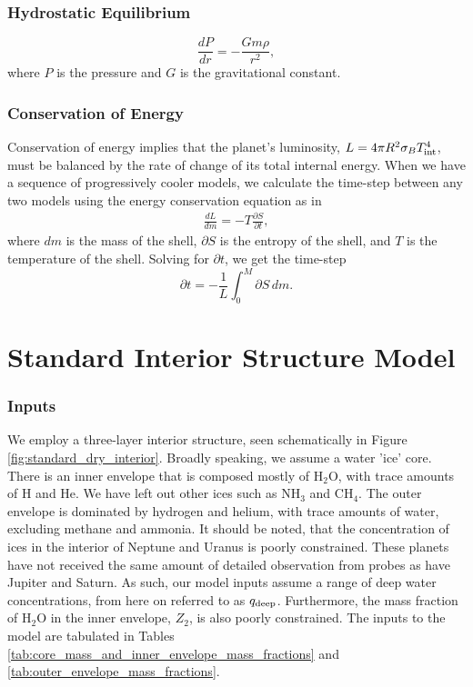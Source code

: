 \documentclass[11pt]{ucscthesisbs}
\begin{document}
\subsubsection{Hydrostatic Equilibrium}
\begin{equation}
  \frac{dP}{dr} = -\frac{Gm\rho}{r^{2}}  ,
\end{equation}
where $P$ is the pressure and $G$ is the gravitational constant. 
\subsubsection{Conservation of Energy}
Conservation of energy implies that the planet's luminosity, $L = 4\pi R^2\sigma_{B}T_{\rm int}^4$, 
must be balanced by the rate of change of its total internal energy. When we have a sequence of progressively cooler models, we calculate the time-step between any two models using the energy conservation equation as in \citep{fortney_2011}
\begin{align}
\frac{dL}{dm}= -T\frac{\partial S}{\partial t},
\label{eq:energy_conservation}
\end{align}
where $dm$ is the mass of the shell, $\partial S$ is the entropy of the shell, and $T$ is the temperature of the shell. Solving for $\partial t$, we get the time-step
\begin{equation}
\partial t = -\frac{1}{L} \int_{0}^{M} \partial S \,dm .
\label{eq:timestep}
\end{equation}

\section{Standard Interior Structure Model}
\subsubsection{Inputs}
We employ a three-layer interior structure, seen schematically in Figure \ref{fig:standard_dry_interior}. Broadly speaking, we assume a water 'ice' core. There is an inner envelope that is composed mostly of H$_{2}$O, with trace amounts of H and He. We have left out other ices such as NH$_{3}$ and CH$_{4}$. The outer envelope is dominated by hydrogen and helium, with trace amounts of water, excluding methane and ammonia. It should be noted, that the concentration of ices in the interior of Neptune and Uranus is poorly constrained. These planets have not received the same amount of detailed observation from probes as have Jupiter and Saturn. As such, our model inputs assume a range of deep water concentrations, from here on referred to as $q_{\rm deep}$. Furthermore, the mass fraction of H$_{2}$O in the inner envelope, $Z_{2}$, is also poorly constrained. The inputs to the model are tabulated in Tables \ref{tab:core_mass_and_inner_envelope_mass_fractions} and \ref{tab:outer_envelope_mass_fractions}.
\end{document}
